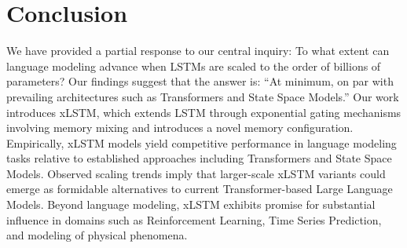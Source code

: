 \section{Conclusion}
We have provided a partial response to our central inquiry: To what extent can language modeling advance when LSTMs are scaled to the order of billions of parameters? Our findings suggest that the answer is: ``At minimum, on par with prevailing architectures such as Transformers and State Space Models.'' Our work introduces xLSTM, which extends LSTM through exponential gating mechanisms involving memory mixing and introduces a novel memory configuration. Empirically, xLSTM models yield competitive performance in language modeling tasks relative to established approaches including Transformers and State Space Models. Observed scaling trends imply that larger-scale xLSTM variants could emerge as formidable alternatives to current Transformer-based Large Language Models. Beyond language modeling, xLSTM exhibits promise for substantial influence in domains such as Reinforcement Learning, Time Series Prediction, and modeling of physical phenomena.

